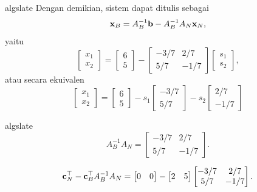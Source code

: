 \begin{solution}
\begin{steppanel}{algslate}
Dengan demikian, sistem dapat ditulis sebagai 
$$
\mathbf{x}_B = A_B^{-1} \mathbf{b} - A_B^{-1}A_N \mathbf{x}_N,
$$
yaitu
\begin{equation}
\begin{bmatrix} x_1 \\ x_2\end{bmatrix} = \begin{bmatrix} 6 \\ 5\end{bmatrix} - \begin{bmatrix}
    -3/7 & 2/7 \\
    5/7 & -1/7
\end{bmatrix} \begin{bmatrix} s_1 \\ s_2 \end{bmatrix},
\end{equation}
atau secara ekuivalen
\begin{equation}
\begin{bmatrix} x_1 \\ x_2\end{bmatrix} = \begin{bmatrix} 6 \\ 5\end{bmatrix} - s_1 \begin{bmatrix}
    -3/7  \\
    5/7 
\end{bmatrix} - s_2 \begin{bmatrix}
     2/7 \\
    -1/7
\end{bmatrix} 
\end{equation}

\end{steppanel}
\begin{steppanel}{algslate}
\[
A_B^{-1} A_N =
\begin{bmatrix}
    -3/7 & 2/7 \\
    5/7 & -1/7
\end{bmatrix}.
\]

\[
\mathbf{c}_N^\top -\mathbf{c}_B^\top A_B^{-1} A_N =
\begin{bmatrix}
    0 & 0
\end{bmatrix}
-
\begin{bmatrix}
    2 & 5
\end{bmatrix}
\begin{bmatrix}
    -3/7 & 2/7 \\
    5/7 & -1/7
\end{bmatrix}.
\]


\end{steppanel}
\end{solution}
